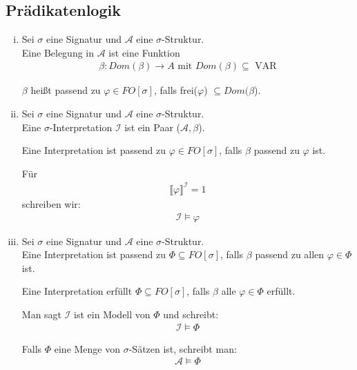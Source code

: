 \documentclass[a4paper,10pt]{article}
\begin{document}
	\subsection*{Prädikatenlogik}
		\begin{enumerate}[(i)]
			\item
				Sei $\sigma$ eine Signatur und $\mathcal{A}$ eine $\sigma$-Struktur.\\
				
				Eine Belegung in $\mathcal{A}$ ist eine Funktion 
				\begin{align*}
					\beta: Dom(\beta) \rightarrow A \text{ mit } Dom(\beta) \subseteq \text{ VAR}
				\end{align*}
				
				
				$\beta$ heißt passend zu $\varphi \in FO[\sigma]$, falls frei($\varphi$) $\subseteq Dom(\beta$). 
			
			\item
				Sei $\sigma$ eine Signatur und $\mathcal{A}$ eine $\sigma$-Struktur.\\
				
				Eine $\sigma$-Interpretation $\mathcal{I}$ ist ein Paar ($\mathcal{A}, \beta$).
				
				Eine Interpretation ist passend zu $\varphi \in FO[\sigma]$, falls $\beta$ passend zu $\varphi$ ist.
				
				Für 
				\begin{align*}
					\llbracket \varphi \rrbracket^{\mathcal{I}} = 1
				\end{align*}
				schreiben wir:
				\begin{align*}
					\mathcal{I} \vDash \varphi
				\end{align*}
				
			\item
				Sei $\sigma$ eine Signatur und $\mathcal{A}$ eine $\sigma$-Struktur.\\
				
				Eine Interpretation ist passend zu $\Phi \subseteq FO[\sigma]$, falls $\beta$ passend zu allen $\varphi \in \Phi$ ist.
				
				Eine Interpretation erfüllt $\Phi \subseteq FO[\sigma]$, falls $\beta$ alle $\varphi \in \Phi$ erfüllt.
				
				Man sagt $\mathcal{I}$ ist ein Modell von $\Phi$ und schreibt:
				\begin{align*}
					\mathcal{I} \vDash \Phi
				\end{align*}
				
				Falls $\Phi$ eine Menge von $\sigma$-Sätzen ist, schreibt man:
				\begin{align*}
					\mathcal{A} \vDash \Phi
				\end{align*}
				

\end{enumerate}
\end{document}
